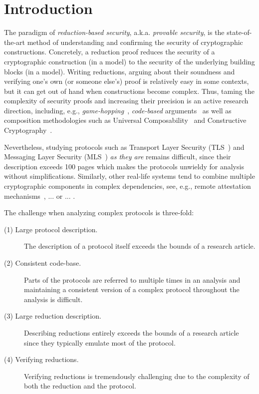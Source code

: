 \section{Introduction}
The paradigm of \emph{reduction-based security}, a.k.a. \emph{provable security}, is the state-of-the-art method of understanding and confirming the security of cryptographic constructions. Concretely, a reduction proof reduces the security of a cryptographic construction (in a model) to the security of the underlying building blocks (in a model). Writing reductions, arguing about their soundness and verifying one's own (or someone else's) proof is relatively easy in some contexts, but it can get out of hand when constructions become complex. Thus, taming the complexity of security proofs and increasing their precision is an active research direction, including, e.g., \emph{game-hopping}~\cite{EPRINT:Shoup04}, \emph{code-based} arguments~\cite{EC:BelRog06} as well as composition methodologies such as Universal Composability~\cite{FOCS:Canetti01} and Constructive Cryptography~\cite{FC:Maurer10}.

Nevertheless, studying protocols such as Transport Layer Security (TLS~\cite{TLS13})
and Messaging Layer Security (MLS~\cite{MLS}) \emph{as they are} 
remains difficult, since their description exceeds 100 pages which makes the protocols unwieldy for analysis without simplifications. Similarly, other real-life systems
tend to combine multiple cryptographic components in complex dependencies,
see, e.g., remote attestation mechanisms~\cite{https://arxiv.org/pdf/2102.08804.pdf,https://en.wikipedia.org/wiki/Trusted_Computing}, ... or ... .

The challenge when analyzing complex protocols is three-fold:
\begin{description}
\item[(1) Large protocol description.] The description of a protocol itself exceeds the bounds of a research
article.
\item[(2) Consistent code-base.] Parts of the protocols are referred to multiple times in an analysis
and maintaining a consistent version of a complex protocol throughout the 
analysis is difficult.
\item[(3) Large reduction description.] Describing reductions entirely exceeds the bounds of a research article 
since they typically emulate most of the protocol.
\item[(4) Verifying reductions.] Verifying reductions is tremendously challenging due to the complexity
of both the reduction and the protocol.
\end{description}


